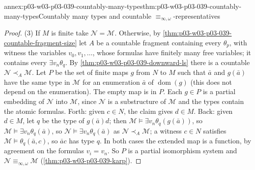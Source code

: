 \begin{annexitem}{annex:p03-w03-p03-039-countably-many-types}{thm:p03-w03-p03-039-countably-many-types}{Countably many types and countable \(\equiv_{\infty,\omega}\)-representatives}
\begin{proof}
(3) If \(M\) is finite take \(\mathcal N=\mathcal M\). Otherwise, by
\cref{thm:p03-w03-p03-039-countable-fragment-size} let \(A\) be a countable
fragment containing every \(\theta_p\), with witness the variables
\(v_0,v_1,\ldots\), whose formulas have finitely many free variables; it
contains every \(\exists v_n\theta_q\). By
\cref{thm:p03-w03-p03-039-downward-ls} there is a countable
\(\mathcal N\prec_A\mathcal M\). Let \(P\) be the set of finite maps \(g\)
from \(N\) to \(M\) such that \(\bar a\) and \(g(\bar a)\) have the same type
in \(\mathcal M\) for an enumeration \(\bar a\) of \(\operatorname{dom}(g)\)
(this does not depend on the enumeration). The empty map is in \(P\). Each
\(g\in P\) is a partial embedding of \(\mathcal N\) into \(\mathcal M\),
since \(\mathcal N\) is a substructure of \(\mathcal M\) and the types
contain the atomic formulas. Forth: given \(c\in N\), the claim gives
\(d\in M\). Back: given \(d\in M\), let \(q\) be the type of \(g(\bar a)d\);
then \(\mathcal M\models\exists v_n\theta_q(g(\bar a))\), so
\(\mathcal M\models\exists v_n\theta_q(\bar a)\), so
\(\mathcal N\models\exists v_n\theta_q(\bar a)\) as \(\mathcal N\prec_A\mathcal M\);
a witness \(c\in N\) satisfies \(\mathcal M\models\theta_q(\bar a,c)\), so
\(\bar ac\) has type \(q\). In both cases the extended map is a function, by
agreement on the formulas \(v_i=v_n\). So \(P\) is a partial isomorphism
system and \(\mathcal N\equiv_{\infty,\omega}\mathcal M\)
(\cref{thm:p03-w03-p03-039-karp}).
\end{proof}
\end{annexitem}

